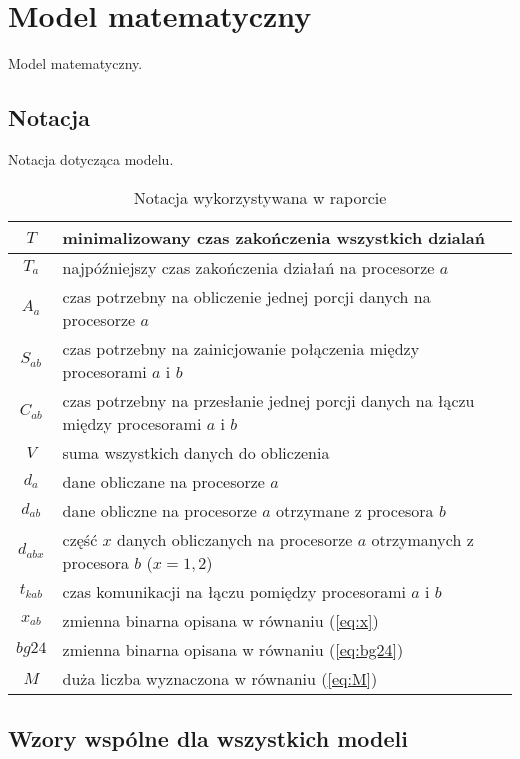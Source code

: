 
\section{Model matematyczny}

Model matematyczny.

\subsection{Notacja}

Notacja dotycząca modelu.

\begin{table}[!ht]
\centering
\begin{tabular}{|c|l|}
\hline
$T$ & minimalizowany czas zakończenia wszystkich dzialań \\ \hline
$T_{a}$ & najpóźniejszy czas zakończenia działań na procesorze $a$ \\ \hline
$A_{a}$ & czas potrzebny na obliczenie jednej porcji danych na procesorze $a$ \\ \hline
$S_{ab}$ & czas potrzebny na zainicjowanie połączenia między procesorami $a$ i $b$ \\ \hline
$C_{ab}$ & czas potrzebny na przesłanie jednej porcji danych na łączu między procesorami $a$ i $b$ \\ \hline
$V$ & suma wszystkich danych do obliczenia \\ \hline
$d_{a}$ & dane obliczane na procesorze $a$ \\ \hline
$d_{ab}$ & dane obliczne na procesorze $a$ otrzymane z procesora $b$ \\ \hline
$d_{abx}$ & część $x$ danych obliczanych na procesorze $a$ otrzymanych z procesora $b$ ($x = 1, 2$) \\ \hline
$t_{kab}$ & czas komunikacji na łączu pomiędzy procesorami $a$ i $b$ \\ \hline
$x_{ab}$ & zmienna binarna opisana w równaniu (\ref{eq:x}) \\ \hline
$bg24$ & zmienna binarna opisana w równaniu (\ref{eq:bg24}) \\ \hline
$M$ & duża liczba wyznaczona w równaniu (\ref{eq:M}) \\ \hline
\end{tabular}
\caption{Notacja wykorzystywana w raporcie}
\label{tab:notacja}
\end{table}

\subsection{Wzory wspólne dla wszystkich modeli}

